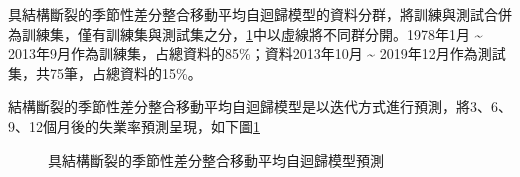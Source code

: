 \documentclass[oneside]{book}
\begin{document}
具結構斷裂的季節性差分整合移動平均自迴歸模型的資料分群，將訓練與測試合併為訓練集，僅有訓練集與測試集之分，\ref{fig:SARIMApred}中以虛線將不同群分開。1978年1月 \textasciitilde{} 2013年9月作為訓練集，占總資料的85\%；資料2013年10月 \textasciitilde{} 2019年12月作為測試集，共75筆，占總資料的15\%。

結構斷裂的季節性差分整合移動平均自迴歸模型是以迭代方式進行預測，將3、6、9、12個月後的失業率預測呈現，如下圖\ref{fig:SARIMApred}

\begin{figure}

{\centering {}\newline{}

}

\caption{具結構斷裂的季節性差分整合移動平均自迴歸模型預測}\label{fig:SARIMApred}
\end{figure}
\end{document}
